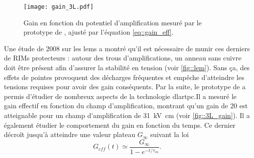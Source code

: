       \begin{figure}[htbp]
        \begin{center}\texttt{[image: gain\_3L.pdf]}\end{center}
        \caption[Gain en fonction du potentiel mesuré par le prototype de \threeL{}.]{
        \label{fig::3L_gain}Gain en fonction du potentiel d'amplification mesuré par le prototype de \threeL{}, ajusté par l'équation \eqref{eq::gain_eff}.}
      \end{figure}

      Une étude de 2008 sur les \glspl{lem}\cite{Breskin2008} a montré qu'il est nécessaire de munir ces derniers de RIMs protecteurs : autour des trous d'amplifications, un anneau sans cuivre doit être présent afin d'assurer la stabilité en tension (voir \autoref{fig::lem}). Sans ça, des effets de pointes provoquent des décharges fréquentes et empêche d'atteindre les tensions requises pour avoir des gain conséquents. Par la suite, le prototype de \threeL{}\cite{Cantini2013,Cantini2014} a permis d'étudier de nombreux aspects de la technologie \gls{dlartpc}.Il a mesuré le gain effectif en fonction du champ d'amplification, montrant qu'un gain de 20 est atteignable pour un champ d'amplification de \SI{31}{\kilo\volt\centi\meter} (voir \autoref{fig::3L_gain}). Il a également étudier le comportement du gain en fonction du temps. Ce dernier décroît jusqu'à atteindre une valeur plateau $G_{\infty}$ suivant la loi
      \begin{equation}
        G_{eff}(t)\simeq \frac{G_{\infty}}{1-e^{-t/\tau_{cu}}}.
      \end{equation}
